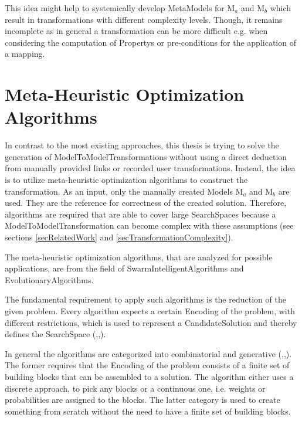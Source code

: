 %
%
%
%
%
%
%
%
%
%
%
%
%
%
%
%




This idea might help to systemically develop \glspl{MetaModel} for M$_a$ and M$_b$ which result in transformations with different complexity levels. Though, it remains incomplete as in general a transformation can be more difficult e.g. when considering the computation of \glspl{Property} or pre-conditions for the application of a mapping.

\section{Meta-Heuristic Optimization Algorithms}\label{secAlgorithms}

In contrast to the most existing approaches, this thesis is trying to solve the generation of \glspl{ModelToModelTransformation} without using a direct deduction from manually provided links or recorded user transformations. Instead, the idea is to utilize meta-heuristic optimization algorithms to construct the transformation. As an input, only the manually created \glspl{Model} M$_a$ and M$_b$ are used. They are the reference for correctness of the created solution. Therefore, algorithms are required that are able to cover large \glspl{SearchSpace} because a \gls{ModelToModelTransformation} can become complex with these assumptions (see sections \ref{secRelatedWork} and \ref{secTransformationComplexity}).

The meta-heuristic optimization algorithms, that are analyzed for possible applications, are from the field of \glspl{SwarmIntelligentAlgorithm} and \glspl{EvolutionaryAlgorithm}.

The fundamental requirement to apply such algorithms is the reduction of the given problem. Every algorithm expects a certain \gls{Encoding} of the problem, with different restrictions, which is used to represent a \gls{CandidateSolution} and thereby defines the \gls{SearchSpace} (\cite{holland75},\cite{Dorigo},\cite{Cook1997}).

In general the algorithms are categorized into combinatorial and generative (\cite{holland75},\cite{Dorigo},\cite{Cook1997}). The former requires that the \gls{Encoding} of the problem consists of a finite set of building blocks that can be assembled to a solution. The algorithm either uses a discrete approach, to pick any blocks or a continuous one, i.e. weights or probabilities are assigned to the blocks. The latter category is used to create something from scratch without the need to have a finite set of building blocks.

